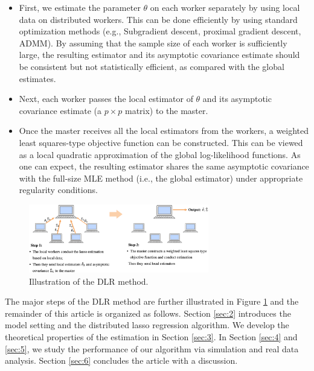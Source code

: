 \documentclass[11pt,en,authoryear]{elegantpaper}
\numberwithin{equation}{section}
\begin{document}
\begin{itemize}
    \item First, we estimate the parameter $\theta$ on each worker separately by using local data on distributed workers. This can be done efficiently by using standard optimization methods (e.g., Subgradient descent, proximal gradient descent, ADMM). By assuming that the sample size of each worker is sufficiently large, the resulting estimator and its asymptotic covariance estimate should be consistent but not statistically efficient, as compared with the global estimates.
    \item Next, each worker passes the local estimator of $\theta$ and its asymptotic covariance estimate (a $p \times p$ matrix) to the master.
    \item Once the master receives all the local estimators from the workers, a weighted least squares-type objective function can be constructed. This can be viewed as a local quadratic approximation of the global log-likelihood functions. As one can expect, the resulting estimator shares the same asymptotic covariance with the full-size MLE method (i.e., the global estimator) under appropriate regularity conditions.
\end{itemize}

\begin{center}
    \begin{figure}[h]
        \centering
        \includegraphics[width=0.7\textwidth]{image/fig1.png}
        \caption{Illustration of the DLR method.}
        \label{fig1}
    \end{figure}
\end{center}

The major steps of the DLR method are further illustrated in Figure \ref{fig1} and 
the remainder of this article is organized as follows. Section \ref{sec:2} introduces the model setting and the distributed lasso regression algorithm. We develop the theoretical properties of the estimation in Section \ref{sec:3}. In Section \ref{sec:4} and \ref{sec:5}, we study the performance of our algorithm via simulation and real data analysis. Section \ref{sec:6} concludes the article with a discussion.
\end{document}
